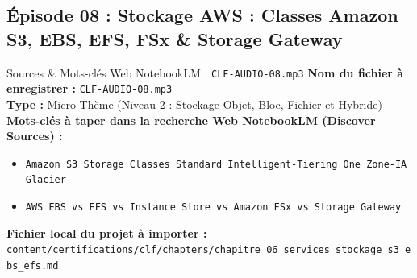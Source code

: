 \documentclass[11pt,a4paper]{article}
\begin{document}
\subsection{Épisode 08 : Stockage AWS : Classes Amazon S3, EBS, EFS, FSx \& Storage Gateway}
\begin{sourcebox}{Sources \& Mots-clés Web NotebookLM : \texttt{CLF-AUDIO-08.mp3}}
\textbf{Nom du fichier à enregistrer :} \texttt{CLF-AUDIO-08.mp3}\\
\textbf{Type :} Micro-Thème (Niveau 2 : Stockage Objet, Bloc, Fichier et Hybride)\\
\textbf{Mots-clés à taper dans la recherche Web NotebookLM (Discover Sources) :}
\begin{itemize}[noitemsep]
    \item \texttt{Amazon S3 Storage Classes Standard Intelligent-Tiering One Zone-IA Glacier}
    \item \texttt{AWS EBS vs EFS vs Instance Store vs Amazon FSx vs Storage Gateway}
\end{itemize}
\textbf{Fichier local du projet à importer :}
\texttt{content/certifications/clf/chapters/chapitre_06_services_stockage_s3_ebs_efs.md}
\end{sourcebox}
\end{document}
